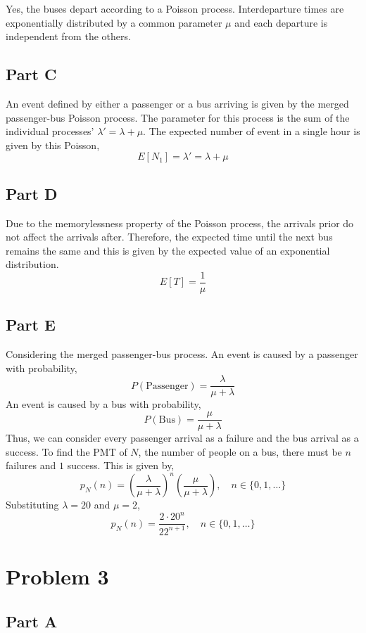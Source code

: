 \documentclass{article}
\begin{document}
Yes, the buses depart according to a Poisson process. Interdeparture times
are exponentially distributed by a common parameter $\mu$ and each departure
is independent from the others.

\subsection*{Part C}

An event defined by either a passenger or a bus arriving is given by the
merged passenger-bus Poisson process. The parameter for this process is the
sum of the individual processes' $\lambda' = \lambda + \mu$. The expected
number of event in a single hour is given by this Poisson,
$$ E[N_1] = \lambda' = \lambda + \mu $$

\subsection*{Part D}

Due to the memorylessness property of the Poisson process, the arrivals prior
do not affect the arrivals after. Therefore, the expected time until the next
bus remains the same and this is given by the expected value of an
exponential distribution.
$$ E[T] = \frac{1}{\mu} $$

\subsection*{Part E}

Considering the merged passenger-bus process. An event is caused by a
passenger with probability,
$$ P(\mathrm{Passenger}) = \frac{\lambda}{\mu + \lambda} $$
An event is caused by a bus with probability,
$$ P(\mathrm{Bus}) = \frac{\mu}{\mu + \lambda} $$
Thus, we can consider every passenger arrival as a failure and the bus
arrival as a success. To find the PMT of $N$, the number of people on a bus,
there must be $n$ failures and $1$ success. This is given by,
$$ p_N(n) = \left(\frac{\lambda}{\mu + \lambda}\right)^n \left(\frac{\mu}{\mu
+ \lambda}\right),\quad n \in \{0, 1, \ldots\} $$
Substituting $\lambda = 20$ and $\mu = 2$,
$$ p_N(n) = \frac{2 \cdot 20^n}{22^{n+1}},\quad n \in \{0, 1, \ldots\} $$

\section*{Problem 3}

\subsection*{Part A}
\end{document}

